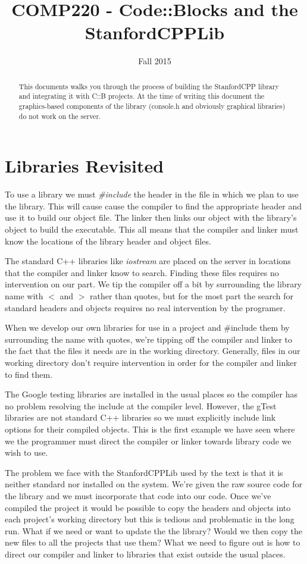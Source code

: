 \documentclass[10pt]{article}
\title{COMP220 - Code::Blocks and the StanfordCPPLib}
\author{ }
\date{Fall 2015}
\begin{document}
\maketitle

\begin{abstract}
This documents walks you through the process of building the StanfordCPP library and integrating it with C::B projects. At the time of writing this document the graphics-based components of the library (console.h and obviously graphical libraries) do not work on the server. 
\end{abstract}

\section{ Libraries Revisited }

To use a library we must \textit{\#include} the header in the file in which we plan to use the library. This will cause cause the compiler to find the appropriate header and use it to build our object file. The linker then links our object with the library's object to build the executable. This all means that the compiler and linker must know the locations of the library header and object files.

The standard C++ libraries like \textit{iostream} are placed on the server in locations that the compiler and linker know to search. Finding these files requires no intervention on our part. We tip the compiler off a bit by surrounding the library name with $<$ and $>$ rather than quotes, but for the most part the search for standard headers and objects requires no real intervention by the programer. 

When we develop our own libraries for use in a project and \#include them by surrounding the name with quotes, we're tipping off the compiler and linker to the fact that the files it needs are in the working directory.  Generally, files in our working directory don't require intervention in order for the compiler and linker to find them.

The Google testing libraries are installed in the usual places so the compiler has no problem resolving the include at the compiler level. However, the gTest libraries are not standard C++ libraries so we must explicitly include link options for their compiled objects. This is the first example we have seen where we the programmer must direct the compiler or linker towards library code we wish to use. 


The problem we face with the StanfordCPPLib used by the text is that it is neither standard nor installed on the system. We're given the raw source code for the library and we must incorporate that code into our code. Once we've compiled the project it would be possible to copy the headers and objects into each project's working directory but this is tedious and problematic in the long run. What if we need or want to update the the library? Would we then copy the new files to all the projects that use them? What we need to figure out is how to direct our compiler and linker to libraries that exist outside the usual places. 
\end{document}
